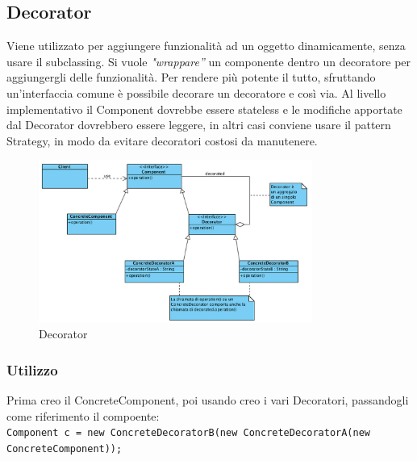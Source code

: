 \subsection{Decorator}
Viene utilizzato per aggiungere funzionalità ad un oggetto dinamicamente, senza usare il subclassing.
Si vuole \textit{"wrappare”} un componente dentro un decoratore per aggiungergli delle funzionalità. Per rendere più potente il tutto, sfruttando un’interfaccia comune è possibile decorare un decoratore e così via.
Al livello implementativo il Component dovrebbe essere stateless e le modifiche apportate dal Decorator dovrebbero essere leggere, in altri casi conviene usare il pattern Strategy, in modo da evitare decoratori costosi da manutenere.

\begin{figure}[ht]
    \centering
    \includegraphics[width=0.8\textwidth]{immagini/decorator.png}
    \caption{Decorator}
\end{figure}
\FloatBarrier
\subsubsection{Utilizzo}
Prima creo il ConcreteComponent, poi usando creo i vari Decoratori, passandogli come riferimento il compoente: \\
\texttt{Component c = new ConcreteDecoratorB(new ConcreteDecoratorA(new ConcreteComponent));}
